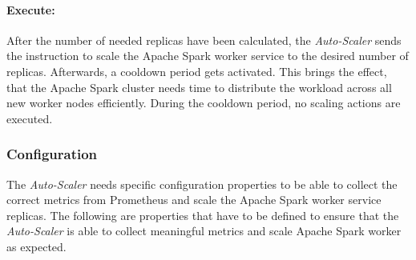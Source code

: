 \paragraph{Execute:}
After the number of needed replicas have been calculated, the \textit{Auto-Scaler} sends the instruction to scale the Apache Spark worker service to the desired number of replicas.
Afterwards, a cooldown period gets activated. This brings the effect, that the Apache Spark cluster needs time to distribute the workload across all new worker nodes efficiently. During the cooldown period, no scaling actions are executed.


\subsubsection{Configuration}
\label{subsubsec:05_am_auto-scaler_config}
The \textit{Auto-Scaler} needs specific configuration properties to be able to collect the correct metrics from Prometheus and scale the Apache Spark worker service replicas. The following are properties that have to be defined to ensure that the \textit{Auto-Scaler} is able to collect meaningful metrics and scale Apache Spark worker as expected.

